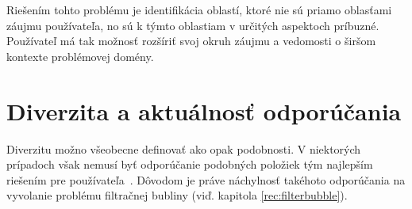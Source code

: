 Riešením tohto problému je identifikácia oblastí, ktoré nie sú priamo oblasťami záujmu používateľa, no sú k týmto
oblastiam v určitých aspektoch príbuzné. Používateľ má tak možnosť rozšíriť svoj okruh záujmu a vedomosti o širšom
kontexte problémovej domény.













\afterpage{\blankpage}
\chapter{Diverzita a aktuálnosť odporúčania}

Diverzitu možno všeobecne definovať ako opak podobnosti. V niektorých prípadoch však nemusí byť odporúčanie podobných
položiek tým najlepším riešením pre používateľa~\cite{Handbook2011}. Dôvodom je práve náchylnosť takéhoto odporúčania na
vyvolanie problému filtračnej bubliny (viď. kapitola \ref{rec:filterbubble}).

